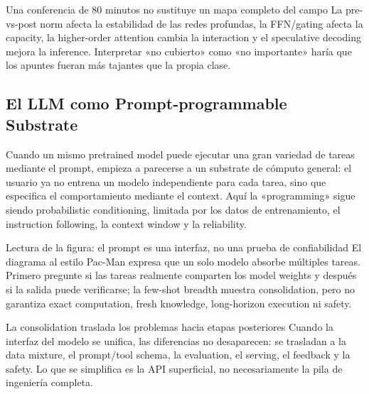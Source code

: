 \begin{warningbox}{Una conferencia de 80 minutos no sustituye un mapa completo del campo}
La pre-vs-post norm afecta la estabilidad de las redes profundas, la FFN/gating afecta la capacity, la higher-order attention cambia la interaction y el speculative decoding mejora la inference. Interpretar «no cubierto» como «no importante» haría que los apuntes fueran más tajantes que la propia clase.
\end{warningbox}


\subsection{El LLM como Prompt-programmable Substrate}

Cuando un mismo pretrained model puede ejecutar una gran variedad de tareas mediante el prompt, empieza a parecerse a un substrate de cómputo general: el usuario ya no entrena un modelo independiente para cada tarea, sino que especifica el comportamiento mediante el context. Aquí la «programming» sigue siendo probabilistic conditioning, limitada por los datos de entrenamiento, el instruction following, la context window y la reliability.


\begin{knowledgebox}{Lectura de la figura: el prompt es una interfaz, no una prueba de confiabilidad}
El diagrama al estilo Pac-Man expresa que un solo modelo absorbe múltiples tareas. Primero pregunte si las tareas realmente comparten los model weights y después si la salida puede verificarse; la few-shot breadth muestra consolidation, pero no garantiza exact computation, fresh knowledge, long-horizon execution ni safety.
\end{knowledgebox}

\begin{importantbox}{La consolidation traslada los problemas hacia etapas posteriores}
Cuando la interfaz del modelo se unifica, las diferencias no desaparecen: se trasladan a la data mixture, el prompt/tool schema, la evaluation, el serving, el feedback y la safety. Lo que se simplifica es la API superficial, no necesariamente la pila de ingeniería completa.
\end{importantbox}

